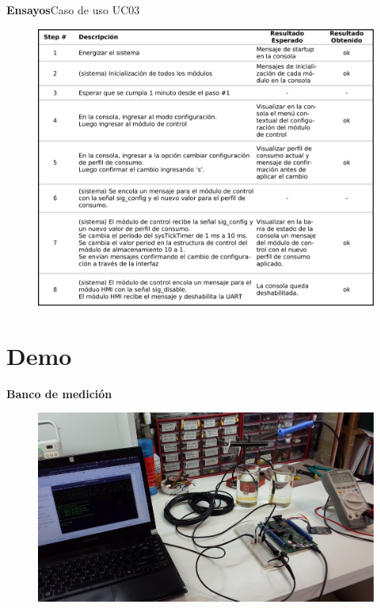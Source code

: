 \documentclass[11pt, xcolor={table,xcdraw}]{beamer}
\begin{document}
\begin{frame}[t]{\textbf{\LARGE{Ensayos}}}{Caso de uso UC03}
	\vspace{-.7cm}
	\begin{figure}[H]
	  \includegraphics[width=.77\textwidth]{./imagenes/UseCase_detalle3.png}
	\end{figure}	
\end{frame}



\section{Demo}

\begin{frame}{\textbf{\LARGE{Banco de medición}}}
	\vspace{-.7cm}
	\begin{figure}[H]
		\includegraphics[width=\textwidth]{./imagenes/banco.jpg}
	\end{figure}	
\end{frame}
\end{document}
